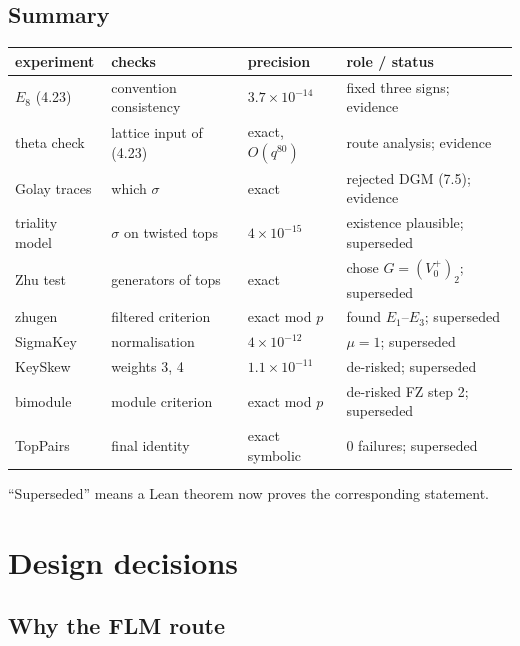 \subsection{Summary}
\begin{center}
\begin{tabular}{p{3.0cm}p{3.6cm}p{2.6cm}p{4.2cm}}
\toprule
experiment & checks & precision & role / status \\
\midrule
$E_8$ (4.23) & convention consistency & $3.7\times10^{-14}$ & fixed three signs; evidence\\
theta check & lattice input of (4.23) & exact, $O(q^{80})$ & route analysis; evidence\\
Golay traces & which $\sigma$ & exact & rejected DGM (7.5); evidence\\
triality model & $\sigma$ on twisted tops & $4\times10^{-15}$ & existence plausible; superseded\\
Zhu test & generators of tops & exact & chose $G=(V_0^+)_2$; superseded\\
zhugen & filtered criterion & exact mod $p$ & found $E_1$--$E_3$; superseded\\
SigmaKey & normalisation & $4\times10^{-12}$ & $\mu=1$; superseded\\
KeySkew & weights 3, 4 & $1.1\times10^{-11}$ & de-risked; superseded\\
bimodule & module criterion & exact mod $p$ & de-risked FZ step 2; superseded\\
TopPairs & final identity & exact symbolic & 0 failures; superseded\\
\bottomrule
\end{tabular}
\end{center}
``Superseded'' means a Lean theorem now proves the corresponding statement.

\section{Design decisions}\label{ch15:sec:design}

\subsection{Why the FLM route}

